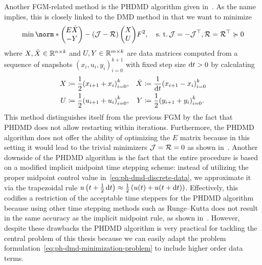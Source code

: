 
Another \ac{FGM}-related method is the \ac{PHDMD} algorithm given in~\cite{Morandin2023}.
As the name implies, this is closely linked to the \ac{DMD} method in that we want to minimize
\begin{equation}\label{eq:ph-dmd-minimization-problem}
    \min \norm*{\begin{pmatrix}
        E \dot{X} \\
        -Y
    \end{pmatrix} - (\mcl{J} - \mcl{R}) \begin{pmatrix}
        X \\
        U
    \end{pmatrix}}{F}^2,\quad \suchthat \mcl{J} = - \mcl{J}\trans, \mcl{R} = \mcl{R}\trans \succcurlyeq 0
\end{equation}
where $X, \dot{X} \in \mathbb{R}^{n \times k}$ and $U, Y \in \mathbb{R}^{m \times k}$ are data matrices computed from a sequence of snapshots ${(x_i, u_i, y_i)}_{i = 0}^{k + 1}$ with fixed step size $\mathop{}\!\mathrm{d} t > 0$ by calculating
\begin{equation}\label{eq:ph-dmd-discrete-data}
    \begin{alignedat}{3}
        X &\coloneqq \frac{1}{2} {\left( x_{i + 1} + x_i \right)}_{i = 0}^k,\quad &\dot{X} &\coloneqq \frac{1}{\mathop{}\!\mathrm{d} t} {\left( x_{i + 1} - x_i \right)}_{i = 0}^k \\
        U &\coloneqq \frac{1}{2} {\left( u_{i + 1} + u_i \right)}_{i = 0}^k,\quad &Y &\coloneqq \frac{1}{2} {\left( y_{i + 1} + y_i \right)}_{i = 0}^k.
    \end{alignedat}
\end{equation}
This method distinguishes itself from the previous \ac{FGM} by the fact that \ac{PHDMD} does not allow restarting within iterations.
Furthermore, the \ac{PHDMD} algorithm does not offer the ability of optimizing the $E$ matrix because in this setting it would lead to the trivial minimizers $\mathcal{J} = \mathcal{R} = 0$ as shown in~\cite[Remark~3.3]{Morandin2023}.
Another downside of the \ac{PHDMD} algorithm is the fact that the entire procedure is based on a modified implicit midpoint time stepping scheme: instead of utilizing the proper midpoint control value in~\eqref{eq:ph-dmd-discrete-data}, we approximate it via the trapezoidal rule $u\left( t + \frac{1}{2} \mathop{}\!\mathrm{d} t \right) \approx \frac{1}{2} \left( u(t) + u(t + \mathop{}\!\mathrm{d} t) \right)$.
Effectively, this codifies a restriction of the acceptable time steppers for the \ac{PHDMD} algorithm because using other time stepping methods such as Runge--Kutta does not result in the same accuracy as the implicit midpoint rule, as shown in~\cite[Section~4.1]{Morandin2023}.
However, despite these drawbacks the \ac{PHDMD} algorithm is very practical for tackling the central problem of this thesis because we can easily adapt the problem formulation~\eqref{eq:ph-dmd-minimization-problem} to include higher order data terms.

